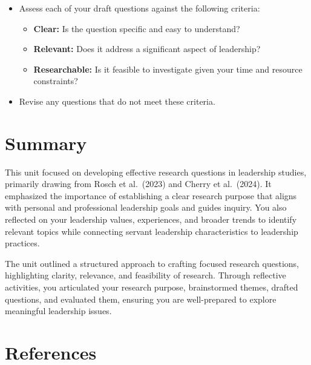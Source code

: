 \documentclass[
  letterpaper,
  DIV=11,
  numbers=noendperiod]{scrreprt}
\providecommand{\tightlist}{%
  \setlength{\itemsep}{0pt}\setlength{\parskip}{0pt}}\usepackage{longtable,booktabs,array}
\begin{document}
\begin{enumerate}
  \begin{itemize}
  \tightlist
  \item
    Assess each of your draft questions against the following criteria:

    \begin{itemize}
    \tightlist
    \item
      \textbf{Clear:} Is the question specific and easy to understand?
    \item
      \textbf{Relevant:} Does it address a significant aspect of
      leadership?
    \item
      \textbf{Researchable:} Is it feasible to investigate given your
      time and resource constraints?
    \end{itemize}
  \item
    Revise any questions that do not meet these criteria.
  \end{itemize}
\end{enumerate}

\section*{Summary}\label{summary-2}


This unit focused on developing effective research questions in
leadership studies, primarily drawing from Rosch et al.~(2023) and
Cherry et al.~(2024). It emphasized the importance of establishing a
clear research purpose that aligns with personal and professional
leadership goals and guides inquiry. You also reflected on your
leadership values, experiences, and broader trends to identify relevant
topics while connecting servant leadership characteristics to leadership
practices.

The unit outlined a structured approach to crafting focused research
questions, highlighting clarity, relevance, and feasibility of research.
Through reflective activities, you articulated your research purpose,
brainstormed themes, drafted questions, and evaluated them, ensuring you
are well-prepared to explore meaningful leadership issues.

\section*{References}\label{references-2}

\end{document}
